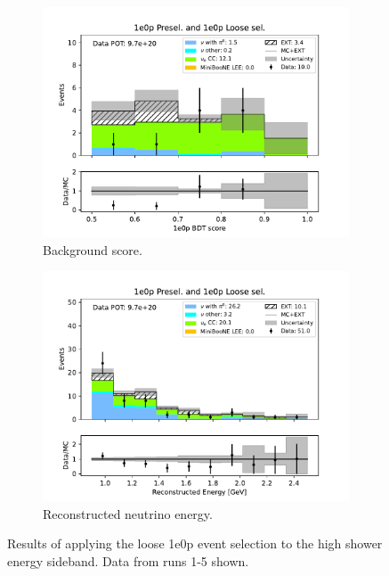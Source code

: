 \begin{figure}[H]
    \centering
    \begin{subfigure}{0.5\linewidth}
        \includegraphics[width=\linewidth]{technote/Sidebands/Figures/ShowerEnergySideband/shr_energy_sideband_bkg_score_run1234b4c4d_ZP_ZPLOOSESEL.pdf}%
        \caption{Background score.}
    \end{subfigure}%
    \begin{subfigure}{0.5\linewidth}
        \includegraphics[width=\linewidth]{technote/Sidebands/Figures/ShowerEnergySideband/shr_energy_sideband_reco_e_run1234b4c4d_ZP_ZPLOOSESEL.pdf}%
        \caption{Reconstructed neutrino energy.}
    \end{subfigure}
    \caption{Results of applying the loose 1e0p event selection to the high shower energy sideband. Data from runs 1-5 shown.}
    \label{fig:ShrEnergySideband1e0pRuns12345}
\end{figure}

